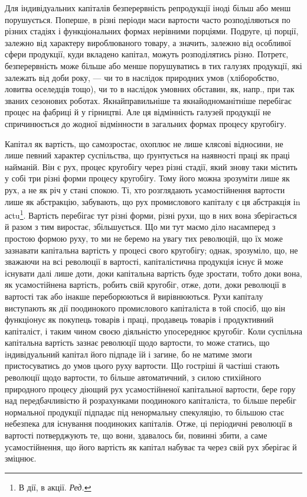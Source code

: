 Для індивідуальних капіталів безперервність репродукції іноді більш
або менш порушується. Поперше, в різні періоди маси вартости часто
розподіляються по різних стадіях і функціональних формах нерівними
порціями. Подруге, ці порції, залежно від характеру вироблюваного товару,
а значить, залежно від особливої сфери продукції, куди вкладено капітал,
можуть розподілятись різно. Потретє, безперервність може більше або
менше порушуватись в тих галузях продукції, які залежать від доби
року, — чи то в наслідок природних умов (хліборобство, ловитва оселедців
тощо), чи то в наслідок умовних обставин, як, напр., при так званих сезонових
роботах. Якнайправильніше та якнайодноманітніше перебігає процес
на фабриці й у гірництві. Але ця відмінність галузей продукції не спричинюється
до жодної відмінности в загальних формах процесу кругобігу.

Капітал як вартість, що самозростає, охоплює не лише клясові
відносини, не лише певний характер суспільства, що ґрунтується на наявності
праці як праці найманій. Він є рух, процес кругобігу через різні
стадії, який знову таки містить у собі три різні форми процесу кругобігу.
Тому його можна зрозуміти лише як рух, а не як річ у стані спокою.
Ті, хто розглядають усамостійнення вартости лише як абстракцію, забувають,
що рух промислового капіталу є ця абстракція іn асtu\footnote*{
В дії, в акції. \emph{Ред.}
}. Вартість
перебігає тут різні форми, різні рухи, що в них вона зберігається й разом
з тим виростає, збільшується. Що ми тут маємо діло насамперед з простою
формою руху, то ми не беремо на увагу тих революцій, що їх
може зазнавати капітальна вартість у процесі свого кругобігу; однак,
зрозуміло, що, не зважаючи на всі революції в вартості, капіталістична
продукція існує й може існувати далі лише доти, доки капітальна вартість
буде зростати, тобто доки вона, як усамостійнена вартість, робить
свій кругобіг, отже, доти, доки революції в вартості так або інакше
переборюються й вирівнюються. Рухи капіталу виступають як дії поодинокого
промислового капіталіста в той спосіб, що він функціонує як
покупець товарів і праці, продавець товарів і продуктивний капіталіст,
і таким чином своєю діяльністю упосереднює кругобіг. Коли суспільна
капітальна вартість зазнає революції щодо вартости, то може статись, що
індивідуальний капітал його підпаде їй і загине, бо не матиме змоги пристосуватись
до умов цього руху вартости. Що гостріші й частіші стають
революції щодо вартости, то більше автоматичний, з силою стихійного
природного процесу діющий рух усамостійненої капітальної вартости,
бере гору над передбачливістю й розрахунками поодинокого капіталіста,
то більше перебіг нормальної продукції підпадає під ненормальну спекуляцію,
то більшою стає небезпека для існування поодиноких капіталів.
Отже, ці періодичні революції в вартості потверджують те, що вони,
здавалось би, повинні збити, а саме усамостійнення, що його вартість
як капітал набуває та через свій рух зберігає й зміцнює.


